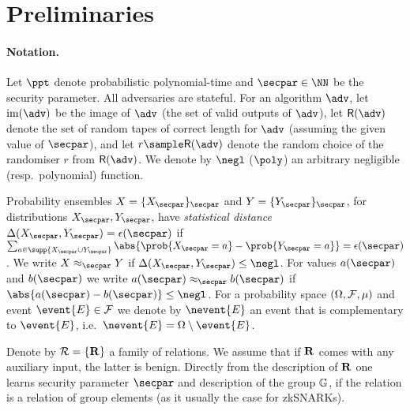 \section{Preliminaries}
\label{sec:preliminaries}
\paragraph{Notation.} Let $\ppt$ denote probabilistic polynomial-time and $\secpar \in \NN$ be the
security parameter. All adversaries are stateful. For an algorithm $\adv$, let
$\image (\adv)$ be the image of $\adv$ (the set of valid outputs of $\adv$), let
$\RND{\adv}$ denote the set of random tapes of correct length for $\adv$
(assuming the given value of $\secpar$), and let $r \sample \RND{\adv}$ denote
the random choice of the randomiser $r$ from $\RND{\adv}$. We denote by $\negl$
($\poly$) an arbitrary negligible (resp.~polynomial) function.

Probability ensembles $X = \smallset{X_\secpar}_\secpar$ and
$Y = \smallset{Y_\secpar}_\secpar$, for distributions $X_\secpar, Y_\secpar$, have
\emph{statistical distance} $\SD(X_\secpar, Y_\secpar) = \epsilon(\secpar)$ if
$\sum_{a \in \supp{X_\secpar \cup Y_\secpar}} \abs{\prob{X_\secpar = a} -
  \prob{Y_\secpar = a}} = \epsilon(\secpar)$. We write $X \approx_\secpar Y$ if
$\SD(X_\secpar, Y_\secpar) \leq \negl$. For values $a(\secpar)$ and $b(\secpar)$ we
write $a(\secpar) \approx_\secpar b(\secpar)$ if
$\abs{a(\secpar) - b(\secpar)} \leq \negl$.  For a probability space
$(\Omega, \mathcal{F}, \mu)$ and event $\event{E} \in \eventspace$ we
denote by $\nevent{E}$ an event that is complementary to $\event{E}$,
i.e.~$\nevent{E} = \samplespace \setminus \event{E}$.


Denote by $\mathcal{R} = \{\mathbf{R}\}$ a family of relations. We assume that if
$\mathbf{R}$ comes with any auxiliary input, the latter is benign. Directly from the
description of $\mathbf{R}$ one learns security parameter $\secpar$ and description of the
group $\mathbb{G}$, if the relation is a relation of group elements (as it usually the case for zkSNARKs).

